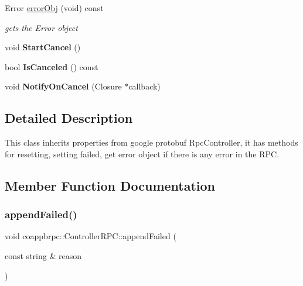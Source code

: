 \begin{DoxyCompactItemize}
\mbox{\label{classcoappbrpc_1_1ControllerRPC_aab955bb22c799e5d544b3083fe64c7d7}} 
Error \hyperlink{classcoappbrpc_1_1ControllerRPC_aab955bb22c799e5d544b3083fe64c7d7}{error\+Obj} (void) const
\begin{DoxyCompactList}\small\item\em gets the Error object \end{DoxyCompactList}\item 
\mbox{\label{classcoappbrpc_1_1ControllerRPC_a48a78ccc3c70a2135c78d612154e077c}} 
void {\bfseries Start\+Cancel} ()
\item 
\mbox{\label{classcoappbrpc_1_1ControllerRPC_ab6458ec248edf24fcc83b12a2573e13f}} 
bool {\bfseries Is\+Canceled} () const
\item 
\mbox{\label{classcoappbrpc_1_1ControllerRPC_abc9385d7476171035cffb779c7966f89}} 
void {\bfseries Notify\+On\+Cancel} (Closure $\ast$callback)
\end{DoxyCompactItemize}


\subsection{Detailed Description}
This class inherits properties from google protobuf Rpc\+Controller, it has methods for resetting, setting failed, get error object if there is any error in the R\+PC. 

\subsection{Member Function Documentation}
\mbox{\label{classcoappbrpc_1_1ControllerRPC_a480586532b344e3ca8da2d2519ba593f}} 
\subsubsection{\texorpdfstring{append\+Failed()}{appendFailed()}}
{\footnotesize\ttfamily void coappbrpc\+::\+Controller\+R\+P\+C\+::append\+Failed (\begin{DoxyParamCaption}\item[{const string \&}]{reason }\end{DoxyParamCaption})\hspace{0.3cm}{\ttfamily [inline]}}



